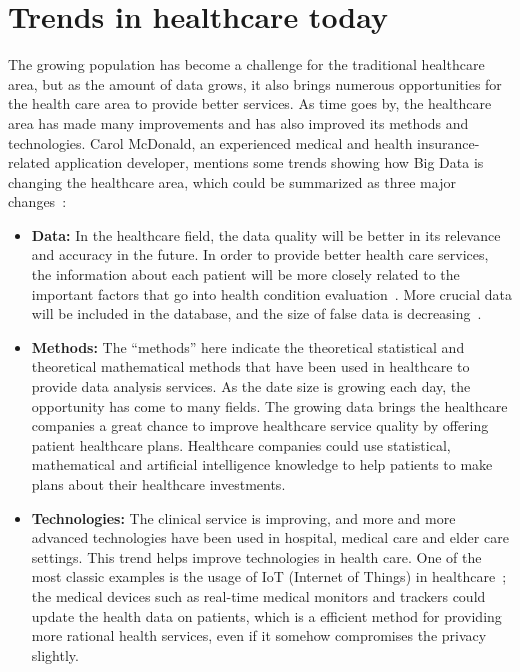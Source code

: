 \section{Trends in healthcare today}
The growing population has become a challenge for the traditional healthcare 
area, but as the amount of data grows, it also brings numerous 
opportunities for the health 
care area to provide better services. As time goes by, the healthcare area 
has made many improvements and has also improved its methods and 
technologies. Carol McDonald, an experienced medical and 
health insurance-related application developer, mentions some trends 
showing how Big Data is changing the healthcare area, which could 
be summarized as three major changes~\cite{5trends}:
\begin{itemize}
	\item \textbf{Data:} In the healthcare field, the data quality 
	will be better 
	in its relevance and accuracy in the future. In order to 
	provide better health 
	care services, the information about each patient 
	will be more closely 
	related to the important factors that go into health 
	condition 
	evaluation~\cite{hdata}. More crucial data will be 
	included in the database, 
	and the size of false data is decreasing~\cite{hdata}.
	\item \textbf{Methods:} The ``methods'' here indicate 
	the theoretical 
	statistical and theoretical mathematical methods that 
	have been used in 
	healthcare to 
	provide data analysis services. As the date size is 
	growing each day, the 
	opportunity has come to many fields. The growing 
	data brings the 
	healthcare companies a great chance to improve 
	healthcare service 
	quality by offering patient healthcare plans. 
	Healthcare companies could 
	use statistical, mathematical and artificial 
	intelligence knowledge to help 
	patients to make plans about their healthcare investments.
	\item \textbf{Technologies:} The clinical service is improving, 
	and more and more advanced technologies have been used in 
	hospital, medical care and 
	elder care settings. This trend helps improve 
	technologies in health 
	care. One of the most classic examples is the 
	usage of IoT (Internet of 
	Things) in healthcare~\cite{iot}; the medical devices such as real-time 
	medical monitors and trackers could update 
	the health data 
on patients, which is a efficient method for 
providing more rational health 
	services, even if it somehow 
	compromises the privacy slightly.
\end{itemize}

